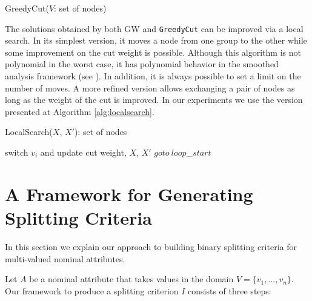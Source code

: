 \begin{algorithm}[tb]
   \caption{ GreedyCut($V$: set of nodes)}
   \label{alg:greedy}
\begin{algorithmic}
\ENDFOR
{}

\end{algorithmic}
\end{algorithm}


The solutions obtained by both GW and {\tt GreedyCut} 
can be improved via a local search.
In its simplest version, it
moves a node from one group to
the other while some improvement on the cut weight is possible.
Although this algorithm is not polynomial  in the worst case,
it has polynomial behavior in the smoothed analysis framework (see \cite{journals/corr/AngelBPW16}). In addition, it is always possible
to set a limit on the number of moves.
A more refined version  allows exchanging a pair of nodes
as long as the weight of the cut is improved.
In our experiments we use the version presented at 
Algorithm \ref{alg:localsearch}.


\begin{algorithm}[tb]
   \caption{ LocalSearch($X$, $X'$): set of nodes}
   \label{alg:localsearch}
\begin{algorithmic}
\STATE switch $v_i$ and update cut weight, $X$, $X'$
\STATE $goto~ loop$\_$start$
\ENDIF
\ENDFOR
{}
\ENDIF
\ENDFOR
{}

\end{algorithmic}
\end{algorithm}


\section{A Framework for Generating Splitting Criteria}
\label{sec:maxcut}
In this section we explain 
our approach to building binary splitting criteria
for  multi-valued nominal attributes.

Let $A$ be a nominal attribute  that takes
values in the domain $V=\{v_1,\ldots,v_n\}$.
Our framework to produce a splitting criterion $I$ 
consists of three steps:

